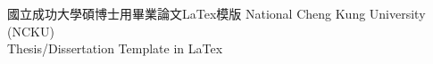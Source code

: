 \SetTitle %
{國立成功大學碩博士用畢業論文LaTex模版} %
{National Cheng Kung University (NCKU) \\Thesis/Dissertation Template in LaTex}






%

\PhdDegree













